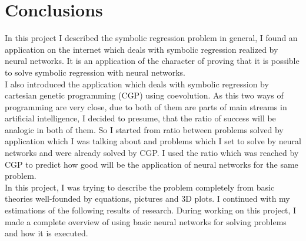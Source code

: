 \documentclass[a4paper,oneside,onecolumn,11pt]{report}
\begin{document}
\chapter{Conclusions}
	In this project I described the symbolic regression problem in general, I found an application on the
	internet which deals with symbolic regression realized by neural networks. It is an application of 
	the character of proving that it is possible to solve symbolic regression with neural networks. \\

	I also introduced the application which deals with symbolic regression by cartesian genetic programming
	(CGP) using coevolution. As this two ways of programming are very close, due to both of them are parts of
	main streams in artificial intelligence, I decided to presume, that the ratio of success will be analogic
	in both of them. So I started from ratio between problems solved by application which I was talking about
	and problems which I set to solve by neural networks and were already solved by CGP. I used the ratio which
	was reached by CGP to predict how good will be the application of neural networks for the same problem. \\

	In this project, I was trying to describe the problem completely from basic theories well-founded by equations,
	pictures and 3D plots. I continued with my estimations of the following results of research. During working 
	on this project, I made a complete overview of using basic neural networks for solving problems and how it is
	executed.


\begin{flushleft}
\end{flushleft}
\appendix
\end{document}
